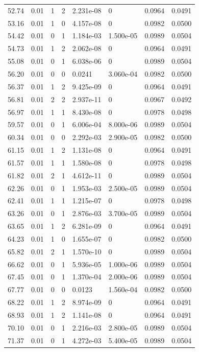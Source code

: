\documentclass[preview]{standalone}
\begin{document}
{{{\begin{tabular}{L{1.2cm}C{1.2cm} C{0.3cm}C{0.5cm} C{1.4cm}C{1.4cm} C{1.4cm}C{1.4cm}}
  52.74  &  0.01  & 1     &  2 &  2.231e-08  & 0  & 0.0964 &  0.0491   \\ 
  53.16  &  0.01  & 1     &  0 &  4.157e-08  & 0  & 0.0982 &  0.0500   \\ 
  54.42  &  0.01  & 0     &  1 &  1.184e-03  & 1.500e-05  & 0.0989 &  0.0504   \\ 
  54.73  &  0.01  & 1     &  2 &  2.062e-08  & 0  & 0.0964 &  0.0491   \\ 
  55.08  &  0.01  & 0     &  1 &  6.038e-06  & 0  & 0.0989 &  0.0504   \\ 
  56.20  &  0.01  & 0     &  0 &  0.0241  & 3.060e-04  & 0.0982 &  0.0500   \\ 
  56.37  &  0.01  & 1     &  2 &  9.425e-09  & 0  & 0.0964 &  0.0491   \\ 
  56.81  &  0.01  & 2     &  2 &  2.937e-11  & 0  & 0.0967 &  0.0492   \\ 
  56.97  &  0.01  & 1     &  1 &  8.430e-08  & 0  & 0.0978 &  0.0498   \\ 
  59.57  &  0.01  & 0     &  1 &  6.006e-04  & 8.000e-06  & 0.0989 &  0.0504   \\ 
  60.34  &  0.01  & 0     &  0 &  2.292e-03  & 2.900e-05  & 0.0982 &  0.0500   \\ 
  61.15  &  0.01  & 1     &  2 &  1.131e-08  & 0  & 0.0964 &  0.0491   \\ 
  61.57  &  0.01  & 1     &  1 &  1.580e-08  & 0  & 0.0978 &  0.0498   \\ 
  61.82  &  0.01  & 2     &  1 &  4.612e-11  & 0  & 0.0989 &  0.0504   \\ 
  62.26  &  0.01  & 0     &  1 &  1.953e-03  & 2.500e-05  & 0.0989 &  0.0504   \\ 
  62.41  &  0.01  & 1     &  1 &  1.215e-07  & 0  & 0.0978 &  0.0498   \\ 
  63.26  &  0.01  & 0     &  1 &  2.876e-03  & 3.700e-05  & 0.0989 &  0.0504   \\ 
  63.65  &  0.01  & 1     &  2 &  6.281e-09  & 0  & 0.0964 &  0.0491   \\ 
  64.23  &  0.01  & 1     &  0 &  1.655e-07  & 0  & 0.0982 &  0.0500   \\ 
  65.82  &  0.01  & 2     &  1 &  1.570e-10  & 0  & 0.0989 &  0.0504   \\ 
  66.62  &  0.01  & 0     &  1 &  5.936e-05  & 1.000e-06  & 0.0989 &  0.0504   \\ 
  67.45  &  0.01  & 0     &  1 &  1.370e-04  & 2.000e-06  & 0.0989 &  0.0504   \\ 
  67.77  &  0.01  & 0     &  0 &  0.0123  & 1.560e-04  & 0.0982 &  0.0500   \\ 
  68.22  &  0.01  & 1     &  2 &  8.974e-09  & 0  & 0.0964 &  0.0491   \\ 
  68.93  &  0.01  & 1     &  2 &  1.141e-08  & 0  & 0.0964 &  0.0491   \\ 
  70.10  &  0.01  & 0     &  1 &  2.216e-03  & 2.800e-05  & 0.0989 &  0.0504   \\ 
  71.37  &  0.01  & 0     &  1 &  4.272e-03  & 5.400e-05  & 0.0989 &  0.0504   \\ 
\hline 
\end{tabular} 

}}}
\end{document}

